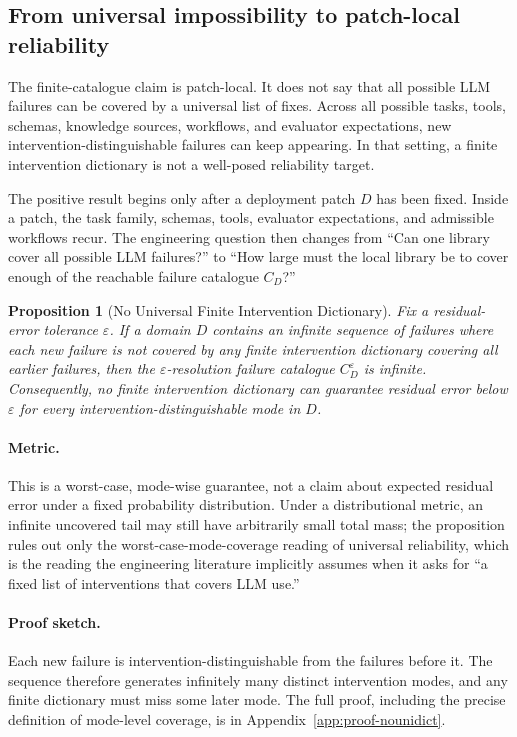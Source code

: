 \documentclass{article}
\theoremstyle{taeplain}
\newtheorem{proposition}{Proposition}
\theoremstyle{taedefn}
\begin{document}
\subsection{From universal impossibility to patch-local reliability}
\label{sec:proposition}

The finite-catalogue claim is patch-local. It does not say that all possible LLM failures can be covered by a universal list of fixes. Across all possible tasks, tools, schemas, knowledge sources, workflows, and evaluator expectations, new intervention-distinguishable failures can keep appearing. In that setting, a finite intervention dictionary is not a well-posed reliability target.

The positive result begins only after a deployment patch $D$ has been fixed. Inside a patch, the task family, schemas, tools, evaluator expectations, and admissible workflows recur. The engineering question then changes from ``Can one library cover all possible LLM failures?'' to ``How large must the local library be to cover enough of the reachable failure catalogue $C_D$?''

\begin{proposition}[No Universal Finite Intervention Dictionary]\label{prop:nounidict}
Fix a residual-error tolerance $\varepsilon$. If a domain $D$ contains an infinite sequence of failures where each new failure is not covered by any finite intervention dictionary covering all earlier failures, then the $\varepsilon$-resolution failure catalogue $C_D^{\varepsilon}$ is infinite. Consequently, no finite intervention dictionary can guarantee residual error below $\varepsilon$ for every intervention-distinguishable mode in $D$.
\end{proposition}

\paragraph{Metric.}
This is a worst-case, mode-wise guarantee, not a claim about expected residual error under a fixed probability distribution. Under a distributional metric, an infinite uncovered tail may still have arbitrarily small total mass; the proposition rules out only the worst-case-mode-coverage reading of universal reliability, which is the reading the engineering literature implicitly assumes when it asks for ``a fixed list of interventions that covers LLM use.''

\paragraph{Proof sketch.}
Each new failure is intervention-distinguishable from the failures before it. The sequence therefore generates infinitely many distinct intervention modes, and any finite dictionary must miss some later mode. The full proof, including the precise definition of mode-level coverage, is in Appendix~\ref{app:proof-nounidict}.
\end{document}
